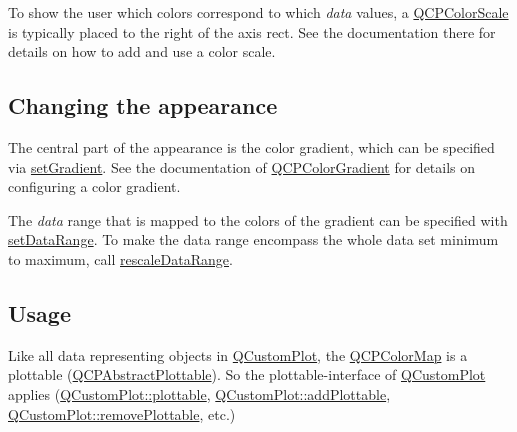 To show the user which colors correspond to which {\itshape data} values, a \hyperlink{class_q_c_p_color_scale}{Q\+C\+P\+Color\+Scale} is typically placed to the right of the axis rect. See the documentation there for details on how to add and use a color scale.\hypertarget{class_q_c_p_statistical_box_appearance}{}\subsection{Changing the appearance}\label{class_q_c_p_statistical_box_appearance}
The central part of the appearance is the color gradient, which can be specified via \hyperlink{class_q_c_p_color_map_a7313c78360471cead3576341a2c50377}{set\+Gradient}. See the documentation of \hyperlink{class_q_c_p_color_gradient}{Q\+C\+P\+Color\+Gradient} for details on configuring a color gradient.

The {\itshape data} range that is mapped to the colors of the gradient can be specified with \hyperlink{class_q_c_p_color_map_a980b42837821159786a85b4b7dcb8774}{set\+Data\+Range}. To make the data range encompass the whole data set minimum to maximum, call \hyperlink{class_q_c_p_color_map_a856608fa3dd1cc290bcd5f29a5575774}{rescale\+Data\+Range}.\hypertarget{class_q_c_p_statistical_box_usage}{}\subsection{Usage}\label{class_q_c_p_statistical_box_usage}
Like all data representing objects in \hyperlink{class_q_custom_plot}{Q\+Custom\+Plot}, the \hyperlink{class_q_c_p_color_map}{Q\+C\+P\+Color\+Map} is a plottable (\hyperlink{class_q_c_p_abstract_plottable}{Q\+C\+P\+Abstract\+Plottable}). So the plottable-\/interface of \hyperlink{class_q_custom_plot}{Q\+Custom\+Plot} applies (\hyperlink{class_q_custom_plot_a32de81ff53e263e785b83b52ecd99d6f}{Q\+Custom\+Plot\+::plottable}, \hyperlink{class_q_custom_plot_ab7ad9174f701f9c6f64e378df77927a6}{Q\+Custom\+Plot\+::add\+Plottable}, \hyperlink{class_q_custom_plot_af3dafd56884208474f311d6226513ab2}{Q\+Custom\+Plot\+::remove\+Plottable}, etc.)


